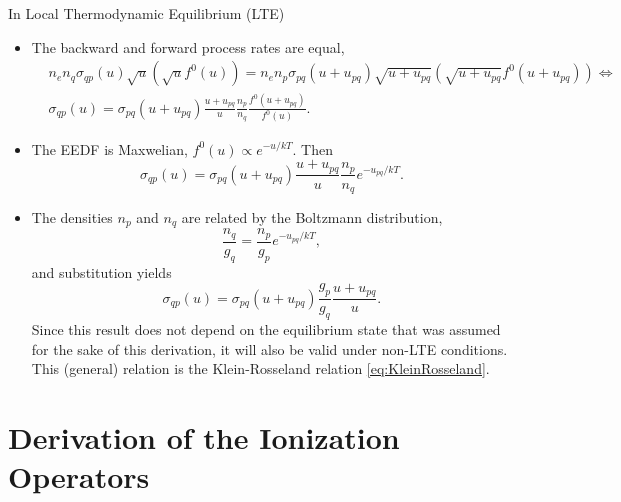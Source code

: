 \documentclass{book}
\begin{document}
In Local Thermodynamic Equilibrium (LTE)
\begin{itemize}
	\item The backward and forward process rates are equal,
	\begin{align*}
		&n_en_q\sigma_{qp}(u)\sqrt{u}(\sqrt{u}f^0(u))
		=
		n_en_p\sigma_{pq}(u+u_{pq})\sqrt{u+u_{pq}}(\sqrt{u+u_{pq}}f^0(u+u_{pq}))
		\iff \\
		&\sigma_{qp}(u)
		=
		\sigma_{pq}(u+u_{pq})\frac{u+u_{pq}}{u}\frac{n_p}{n_q}\frac{f^0(u+u_{pq})}{f^0(u)}.
	\end{align*}
	\item The EEDF is Maxwelian, $f^0(u)\propto e^{-u/kT}$. Then
	\[
		\sigma_{qp}(u)
		=
		\sigma_{pq}(u+u_{pq})\frac{u+u_{pq}}{u}\frac{n_p}{n_q}e^{-u_{pq}/kT}.
	\]
	\item The densities $n_p$ and $n_q$ are related by the Boltzmann distribution,
	\[
		\frac{n_q}{g_q}=\frac{n_p}{g_p}e^{-u_{pq}/kT},
	\]
	and substitution yields
	\[
		\sigma_{qp}(u)
		=
		\sigma_{pq}(u+u_{pq})\frac{g_p}{g_q}\frac{u+u_{pq}}{u}.
	\]
	Since this result does not depend on the equilibrium state that was
	assumed for the sake of this derivation, it will also be valid under non-LTE conditions.
	This (general) relation is the Klein-Rosseland relation \eqref{eq:KleinRosseland}.
\end{itemize}

\chapter{Derivation of the Ionization Operators}

\label{app:ionization}
\end{document}
